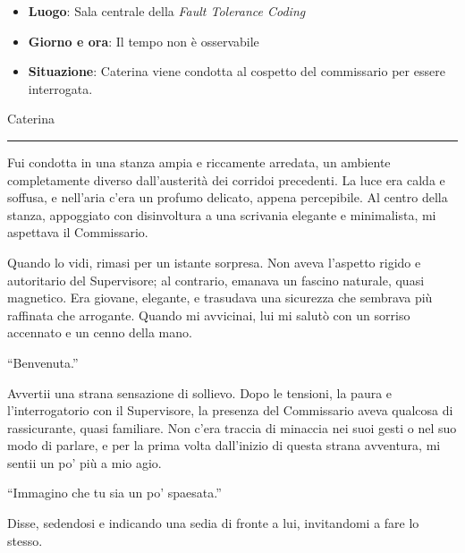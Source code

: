 
\begin{tcolorbox}[colback=gray!5,colframe=gray!80,title=\textbf{Scheda Informativa}]
\begin{itemize}
    \item \textbf{Luogo}: Sala centrale della \emph{Fault Tolerance Coding}
    \item \textbf{Giorno e ora}: Il tempo non è osservabile
    \item \textbf{Situazione}: Caterina viene condotta al cospetto del commissario per essere interrogata.
\end{itemize}
\end{tcolorbox}

\vspace{1em}
\begin{center}Caterina\end{center}
\hrule
\vspace{1em}


Fui condotta in una stanza ampia e riccamente arredata, un ambiente completamente diverso dall'austerità dei corridoi precedenti. La luce era calda e soffusa, e nell'aria c'era un profumo delicato, appena percepibile. Al centro della stanza, appoggiato con disinvoltura a una scrivania elegante e minimalista, mi aspettava il Commissario.

Quando lo vidi, rimasi per un istante sorpresa. Non aveva l'aspetto rigido e autoritario del Supervisore; al contrario, emanava un fascino naturale, quasi magnetico. Era giovane, elegante, e trasudava una sicurezza che sembrava più raffinata che arrogante. Quando mi avvicinai, lui mi salutò con un sorriso accennato e un cenno della mano.

\begin{dialogue}
 \enquote{Benvenuta.}
\end{dialogue}

Avvertii una strana sensazione di sollievo. Dopo le tensioni, la paura e l'interrogatorio con il Supervisore, la presenza del Commissario aveva qualcosa di rassicurante, quasi familiare. Non c'era traccia di minaccia nei suoi gesti o nel suo modo di parlare, e per la prima volta dall'inizio di questa strana avventura, mi sentii un po' più a mio agio.

\begin{dialogue}
 \enquote{Immagino che tu sia un po' spaesata.}
\end{dialogue}

Disse, sedendosi e indicando una sedia di fronte a lui, invitandomi a fare lo stesso.

